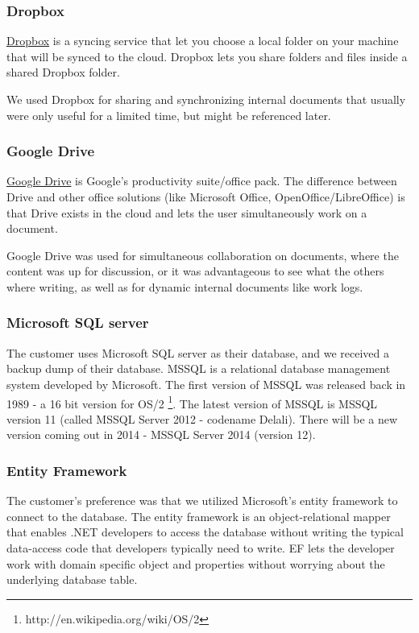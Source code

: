 \subsubsection{Dropbox}
\href{http://www.dropbox.com}{Dropbox} is a syncing service that let you choose a local folder on your machine that will be synced to the cloud. Dropbox lets you share folders and files inside a shared Dropbox folder.

We used Dropbox for sharing and synchronizing internal documents that usually were only useful for a limited time, but might be referenced later.

\subsubsection{Google Drive}
\href{https://drive.google.com/}{Google Drive} is Google's productivity suite/office pack. The difference between Drive and other office solutions (like Microsoft Office, OpenOffice/LibreOffice) is that Drive exists in the cloud and lets the user simultaneously work on a document.

Google Drive was used for simultaneous collaboration on documents, where the content was up for discussion, or it was advantageous to see what the others where writing, as well as for dynamic internal documents like work logs.

\subsubsection{Microsoft SQL server}
The customer uses Microsoft SQL server as their database, and we received a backup dump of their database. MSSQL is a relational database management system developed by Microsoft. The first version of MSSQL was released back in 1989 - a 16 bit version for OS/2 \footnote{http://en.wikipedia.org/wiki/OS/2}. The latest version of MSSQL is MSSQL version 11 (called MSSQL Server 2012 - codename Delali). There will be a new version coming out in 2014 - MSSQL Server 2014 (version 12).

\subsubsection{Entity Framework}
The customer's preference was that we utilized Microsoft's entity framework to connect to the database. The entity framework is an object-relational mapper that enables .NET developers to access the database without writing the typical data-access code that developers typically need to write. EF lets the developer work with domain specific object and properties without worrying about the underlying database table.


